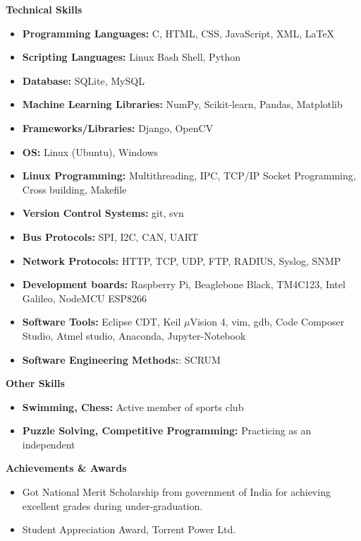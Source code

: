 \documentclass[letterpaper,10pt]{article}
\newcommand{\resheading}[1]{{\large \colorbox{mygrey}{\begin{minipage}{\textwidth}{\textbf{#1 \vphantom{p\^{E}}}}\end{minipage}}}}
\begin{document}
\resheading{Technical Skills}
\begin{itemize}
\item \textbf{Programming Languages:} C, HTML, CSS, JavaScript, XML, LaTeX
\item \textbf{Scripting Languages:} Linux Bash Shell, Python
\item \textbf{Database:} SQLite, MySQL
\item \textbf{Machine Learning Libraries:} NumPy, Scikit-learn, Pandas, Matplotlib
\item \textbf{Frameworks/Libraries:} Django, OpenCV
\item \textbf{OS:} Linux (Ubuntu), Windows
\item \textbf{Linux Programming:} Multithreading, IPC, TCP/IP Socket Programming, Cross building, Makefile
\item \textbf{Version Control Systems:} git, svn
\item \textbf{Bus Protocols:} SPI, I2C, CAN, UART
\item \textbf{Network Protocols:} HTTP, TCP, UDP, FTP, RADIUS, Syslog, SNMP
\item \textbf{Development boards:} Raspberry Pi, Beaglebone Black, TM4C123, Intel Galileo, NodeMCU ESP8266
\item \textbf{Software Tools:} Eclipse CDT, Keil $\mu$Vision 4, vim, gdb, Code Composer Studio, Atmel studio, Anaconda, Jupyter-Notebook
\item \textbf{Software Engineering Methods:}: SCRUM

\end{itemize}

\resheading{Other Skills}
    \begin{itemize}
        \item \textbf{Swimming, Chess:} Active member of sports club
        \item \textbf{Puzzle Solving, Competitive Programming:} Practicing as an independent
    \end{itemize}
        
\resheading{Achievements \& Awards}
\begin{itemize}
	\item Got National Merit Scholarship from government of India for achieving excellent grades during under-graduation.
	\item Student Appreciation Award, Torrent Power Ltd.
\end{itemize}
\end{document}
